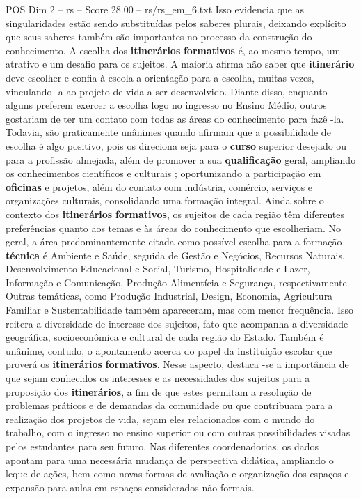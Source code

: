 \begin{textsample}{POS Dim 2 – rs – Score 28.00 – rs/rs\_em\_6.txt}
Isso evidencia que as singularidades estão sendo substituídas pelos saberes plurais, deixando explícito que seus saberes também são importantes no processo da construção do conhecimento.
A escolha dos \textbf{itinerários} \textbf{formativos} é, ao mesmo tempo, um atrativo e um desafio para os sujeitos.
A maioria afirma não saber que \textbf{itinerário} deve escolher e confia à escola a orientação para a escolha, muitas vezes, vinculando -a ao projeto de vida a ser desenvolvido.
Diante disso, enquanto alguns preferem exercer a escolha logo no ingresso no Ensino Médio, outros gostariam de ter um contato com todas as áreas do conhecimento para fazê -la.
Todavia, são praticamente unânimes quando afirmam que a possibilidade de escolha é algo positivo, pois os direciona seja para o \textbf{curso} superior desejado ou para a profissão almejada, além de promover a sua \textbf{qualificação} geral, ampliando os conhecimentos científicos e culturais ; oportunizando a participação em \textbf{oficinas} e projetos, além do contato com indústria, comércio, serviços e organizações culturais, consolidando uma formação integral.
Ainda sobre o contexto dos \textbf{itinerários} \textbf{formativos}, os sujeitos de cada região têm diferentes preferências quanto aos temas e às áreas do conhecimento que escolheriam.
No geral, a área predominantemente citada como possível escolha para a formação \textbf{técnica} é Ambiente e Saúde, seguida de Gestão e Negócios, Recursos Naturais, Desenvolvimento Educacional e Social, Turismo, Hospitalidade e Lazer, Informação e Comunicação, Produção Alimentícia e Segurança, respectivamente.
Outras temáticas, como Produção Industrial, Design, Economia, Agricultura Familiar e Sustentabilidade também apareceram, mas com menor frequência.
Isso reitera a diversidade de interesse dos sujeitos, fato que acompanha a diversidade geográfica, socioeconômica e cultural de cada região do Estado.
Também é unânime, contudo, o apontamento acerca do papel da instituição escolar que proverá os \textbf{itinerários} \textbf{formativos}.
Nesse aspecto, destaca -se a importância de que sejam conhecidos os interesses e as necessidades dos sujeitos para a proposição dos \textbf{itinerários}, a fim de que estes permitam a resolução de problemas práticos e de demandas da comunidade ou que contribuam para a realização dos projetos de vida, sejam eles relacionados com o mundo do trabalho, com o ingresso no ensino superior ou com outras possibilidades visadas pelos estudantes para seu futuro.
Nas diferentes coordenadorias, os dados apontam para uma necessária mudança de perspectiva didática, ampliando o leque de ações, bem como novas formas de avaliação e organização dos espaços e expansão para aulas em espaços considerados não-formais.

\end{textsample}
